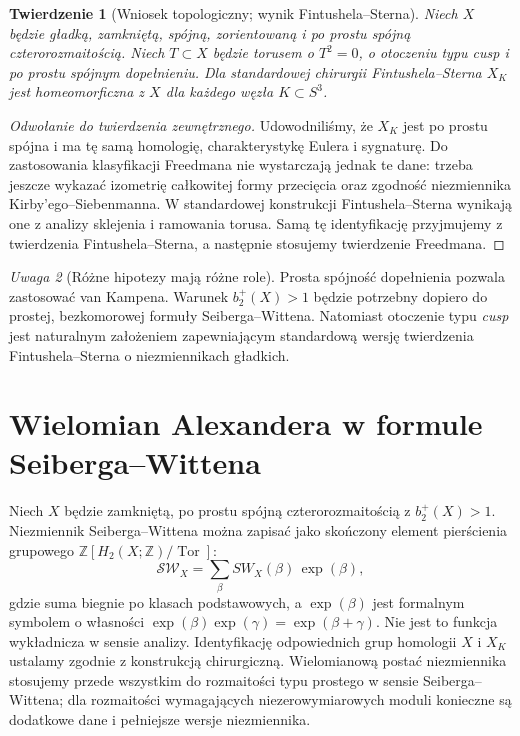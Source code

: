 \documentclass[11pt,a4paper]{report}
\numberwithin{equation}{section}
\theoremstyle{plain}
\newtheorem{twierdzenie}{Twierdzenie}[section]
\theoremstyle{definition}
\theoremstyle{remark}
\newtheorem{uwaga}[twierdzenie]{Uwaga}
\begin{document}
\begin{twierdzenie}[Wniosek topologiczny; wynik Fintushela--Sterna]
\label{thm:tg-ks-homeo}
Niech $X$ będzie gładką, zamkniętą, spójną,
zorientowaną i po prostu spójną czterorozmaitością.
Niech $T\subset X$ będzie torusem o $T^2=0$,
o otoczeniu typu \emph{cusp} i po prostu spójnym
dopełnieniu. Dla standardowej chirurgii
Fintushela--Sterna $X_K$ jest homeomorficzna z $X$
dla każdego węzła $K\subset S^3$.
\end{twierdzenie}

\begin{proof}[Odwołanie do twierdzenia zewnętrznego]
Udowodniliśmy, że $X_K$ jest po prostu spójna i ma
tę samą homologię, charakterystykę Eulera i sygnaturę.
Do zastosowania klasyfikacji Freedmana nie wystarczają
jednak te dane: trzeba jeszcze wykazać izometrię
całkowitej formy przecięcia oraz zgodność niezmiennika
Kirby'ego--Siebenmanna. W standardowej konstrukcji
Fintushela--Sterna wynikają one z analizy sklejenia
i ramowania torusa. Samą tę identyfikację przyjmujemy
z twierdzenia Fintushela--Sterna, a następnie
stosujemy twierdzenie Freedmana.
\end{proof}

\begin{uwaga}[Różne hipotezy mają różne role]
Prosta spójność dopełnienia pozwala zastosować
van Kampena. Warunek $b_2^+(X)>1$ będzie potrzebny
dopiero do prostej, bezkomorowej formuły Seiberga--Wittena.
Natomiast otoczenie typu \emph{cusp} jest naturalnym
założeniem zapewniającym standardową wersję twierdzenia
Fintushela--Sterna o niezmiennikach gładkich.
\end{uwaga}

\section{Wielomian Alexandera w formule Seiberga--Wittena}
\label{sec:tg-ks-sw}

Niech $X$ będzie zamkniętą, po prostu spójną czterorozmaitością
z $b_2^+(X)>1$. Niezmiennik Seiberga--Wittena można zapisać
jako skończony element pierścienia grupowego
$\mathbb Z[H_2(X;\mathbb Z)/\operatorname{Tor}]$:
\[
\mathcal{SW}_X=\sum_{\beta}SW_X(\beta)\,\exp(\beta),
\]
gdzie suma biegnie po klasach podstawowych, a
$\exp(\beta)$ jest formalnym symbolem o własności
$\exp(\beta)\exp(\gamma)=\exp(\beta+\gamma)$.
Nie jest to funkcja wykładnicza w sensie analizy.
Identyfikację odpowiednich grup homologii $X$
i $X_K$ ustalamy zgodnie z konstrukcją chirurgiczną.
Wielomianową postać niezmiennika stosujemy przede wszystkim
do rozmaitości typu prostego w sensie Seiberga--Wittena;
dla rozmaitości wymagających niezerowymiarowych moduli
konieczne są dodatkowe dane i pełniejsze wersje niezmiennika.
\end{document}
